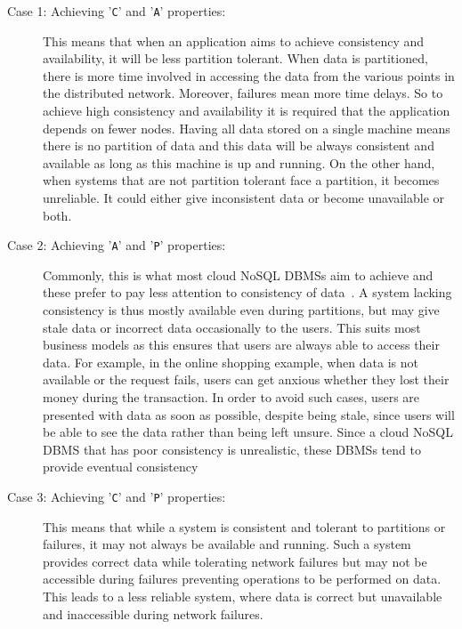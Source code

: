 \begin{description}
	\item [Case 1: Achieving '\texttt{C}' and '\texttt{A}' properties:] This means
	that when an application aims to achieve consistency and availability, it will
	be less partition tolerant.
	When data is partitioned,   there is more time involved in accessing the data
	from the various points in the distributed network.  Moreover,   failures mean
	more time delays.  So to achieve high consistency and availability it is
	required that the application depends on fewer nodes.  Having all data stored on
	a single machine means there is no partition of data and this data will be
	always consistent and available as long as this machine is up and running.   On
	the other hand,   when systems that are not partition tolerant face a partition,
	it becomes unreliable.  It could either give inconsistent data or become
	unavailable or both.
		
	\item [Case 2: Achieving '\texttt{A}' and '\texttt{P}' properties:]
	Commonly,   this is what most cloud \ac{NoSQL} \acp{DBMS} aim to achieve and these
	prefer to pay less attention to consistency of data~\citep{Wada}.
	A system lacking consistency is thus mostly available even during partitions,   but
	may give stale data or incorrect data occasionally to the users.  This suits
	most business models as this ensures that users are always able to
	access their data.  For example,   in the  online shopping example,   when
	data is not available or the request fails,   users can get anxious whether
	they lost their money during the transaction.  In order to avoid such cases,  
	users are presented with data as soon as possible,   despite being stale,   since users
	will be able to see the data rather than being left unsure. 
	Since a cloud \ac{NoSQL} \ac{DBMS} that has poor consistency is unrealistic,  
	these \acp{DBMS} tend to provide eventual consistency
	
	\item [Case 3: Achieving '\texttt{C}' and '\texttt{P}' properties:] This means
	that while a system is consistent and tolerant to partitions or
	failures,   it may not always be available and running.  Such a system 
	provides correct data while tolerating network failures but may not be
	accessible during failures preventing operations to be performed on data.  This
	leads to a less reliable system,   where data is correct but unavailable and
	inaccessible during network failures.
	
	 
\end{description}

